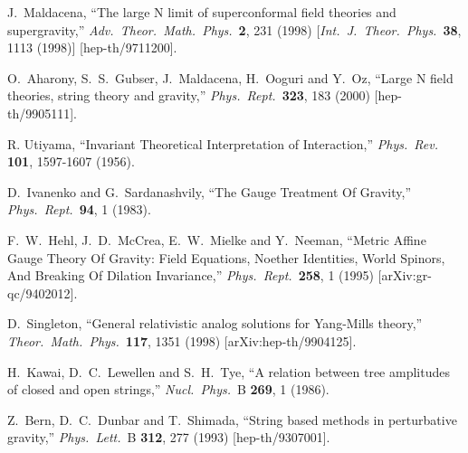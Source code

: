 %
\begin{thebibliography}{99}

J.~Maldacena,
``The large N limit of superconformal field theories and supergravity,''
{\it Adv.\ Theor.\ Math.\ Phys.}\  {\bf 2}, 231 (1998)
[{\it Int.\ J.\ Theor.\ Phys.}\  {\bf 38}, 1113 (1998)]
[hep-th/9711200].

O.~Aharony, S.~S.~Gubser, J.~Maldacena, H.~Ooguri and Y.~Oz,
``Large N field theories, string theory and gravity,''
{\it Phys.\ Rept.}\  {\bf 323}, 183 (2000)
[hep-th/9905111].

R. Utiyama, 
``Invariant Theoretical Interpretation of Interaction,''
{\it Phys.\ Rev.} {\bf 101}, 1597-1607 (1956).

D.~Ivanenko and G.~Sardanashvily,
``The Gauge Treatment Of Gravity,''
{\it Phys.\ Rept.}\  {\bf 94}, 1 (1983).

F.~W.~Hehl, J.~D.~McCrea, E.~W.~Mielke and Y.~Neeman,
``Metric Affine Gauge Theory Of Gravity: Field Equations, 
Noether Identities, World Spinors, And Breaking Of Dilation Invariance,''
{\it Phys.\ Rept.}\  {\bf 258}, 1 (1995)
[arXiv:gr-qc/9402012].

D.~Singleton,
``General relativistic analog solutions for Yang-Mills theory,''
{\it Theor.\ Math.\ Phys.}\  {\bf 117}, 1351 (1998)
[arXiv:hep-th/9904125].

H.~Kawai, D.~C.~Lewellen and S.~H.~Tye,
``A relation between tree amplitudes of closed and open strings,''
{\it Nucl.\ Phys.}\ B {\bf 269}, 1 (1986).

Z.~Bern, D.~C.~Dunbar and T.~Shimada,
``String based methods in perturbative gravity,''
{\it Phys.\ Lett.}\ B {\bf 312}, 277 (1993)
[hep-th/9307001].


\end{thebibliography}
